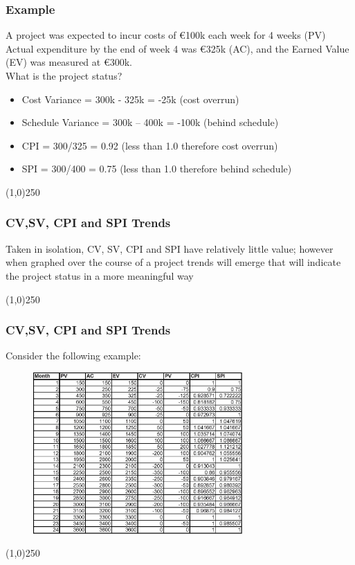 \begin{frame}
\frametitle{Example}
A project was expected to incur costs of \euro100k each week for 4 weeks (PV)\\
Actual expenditure by the end of week 4 was \euro325k (AC), and the Earned Value (EV) was measured at \euro300k.\\
What is the project status?\\
\begin{itemize}
	\item Cost Variance = 300k - 325k = -25k  		(cost overrun)
	\item Schedule Variance = 300k – 400k = -100k 	(behind schedule)
	\item CPI = 300/325 = 0.92 (less than 1.0 therefore cost overrun)
	\item SPI = 300/400 = 0.75 (less than 1.0 therefore behind schedule)
\end{itemize}
\end{frame}
\begin{center}\line(1,0){250}\end{center}






\begin{frame}
\frametitle{CV,SV, CPI and SPI Trends}
Taken in isolation, CV, SV, CPI and SPI have relatively little value; however when graphed over the course of a project trends will emerge that will indicate the project status in a more meaningful way
\end{frame}
\begin{center}\line(1,0){250}\end{center}







\begin{frame}
\frametitle{CV,SV, CPI and SPI Trends}
Consider the following example:
\begin{figure}
	\centering
		\includegraphics[width = 8cm]{images/trends.jpg}
	\label{fig:trends}
\end{figure}
\end{frame}
\begin{center}\line(1,0){250}\end{center}






